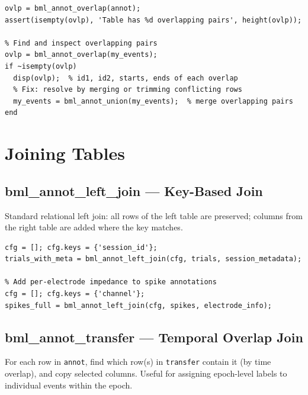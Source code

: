 \documentclass[11pt, a4paper]{article}
\begin{document}
\begin{lstlisting}[style=matlab]
% Validate that a table has no overlaps (required before passing as y to intersect)
ovlp = bml_annot_overlap(annot);
assert(isempty(ovlp), 'Table has %d overlapping pairs', height(ovlp));

% Find and inspect overlapping pairs
ovlp = bml_annot_overlap(my_events);
if ~isempty(ovlp)
  disp(ovlp);  % id1, id2, starts, ends of each overlap
  % Fix: resolve by merging or trimming conflicting rows
  my_events = bml_annot_union(my_events);  % merge overlapping pairs
end
\end{lstlisting}

\section{Joining Tables}
\label{sec:joins}

\subsection{bml\_annot\_left\_join --- Key-Based Join}

Standard relational left join: all rows of the left table are preserved; columns from the right table are added where the key matches.

\begin{lstlisting}[style=matlab]
% Add subject/session metadata to each trial
cfg = []; cfg.keys = {'session_id'};
trials_with_meta = bml_annot_left_join(cfg, trials, session_metadata);

% Add per-electrode impedance to spike annotations
cfg = []; cfg.keys = {'channel'};
spikes_full = bml_annot_left_join(cfg, spikes, electrode_info);
\end{lstlisting}

\subsection{bml\_annot\_transfer --- Temporal Overlap Join}

For each row in \texttt{annot}, find which row(s) in \texttt{transfer} contain it (by time overlap), and copy selected columns. Useful for assigning epoch-level labels to individual events within the epoch.
\end{document}
